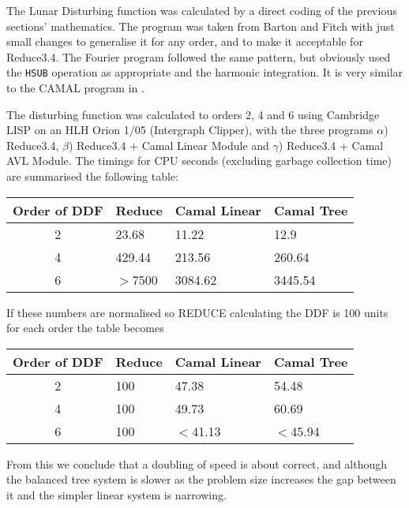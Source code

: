 The Lunar Disturbing function was calculated by a direct coding of the
previous sections' mathematics.  The program was taken from Barton
and Fitch \cite{Barton72} with just small changes to generalise it for
any order, and to make it acceptable for Reduce3.4.  The Fourier
program followed the same pattern, but obviously used the {\tt HSUB}
operation as appropriate and the harmonic integration.  It is very
similar to the CAMAL program in \cite{Barton72}.

The disturbing function was calculated to orders 2, 4 and 6 using
Cambridge LISP on an HLH Orion 1/05 (Intergraph Clipper), with the
three programs $\alpha$) Reduce3.4, $\beta$) Reduce3.4 + Camal Linear
Module and $\gamma$) Reduce3.4 + Camal AVL Module.  The timings for
CPU seconds (excluding garbage collection time) are summarised the
following table:
\medskip
\begin{center}
\begin{tabular}{ | c || l | l | l |}
\hline
Order of DDF    & Reduce        & Camal Linear  & Camal Tree \\
\hline
2       &       23.68   &       11.22   &       12.9    \\
4       &       429.44  &       213.56  &       260.64  \\
6       &       $>$7500 &       3084.62 &       3445.54 \\
\hline
\end{tabular}
\end{center}
\medskip

If these numbers are normalised so REDUCE calculating the DDF is 100
units for each order the table becomes
\medskip
\begin{center}
\begin{tabular}{ | c || l | l | l |}
\hline
Order of DDF    & Reduce        & Camal Linear  & Camal Tree \\ \hline
2       &       100     &       47.38   &       54.48   \\
4       &       100     &       49.73   &       60.69   \\
6       &       100     &       $<$41.13        &       $<$45.94 \\
\hline
\end{tabular}
\end{center}
\medskip

From this we conclude that a doubling of speed is about correct, and
although the balanced tree system is slower as the problem size
increases the gap between it and the simpler linear system is
narrowing.

